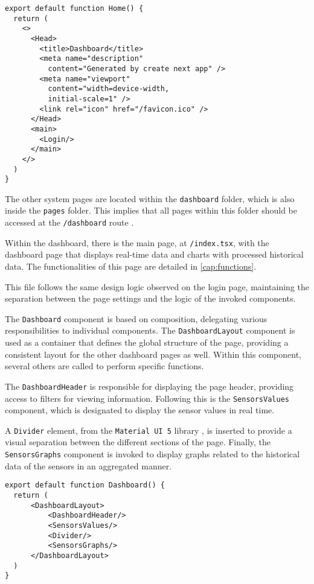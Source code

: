 \begin{Verbatim}[fontsize=\small, baselinestretch=0.8]
export default function Home() {
  return (
    <>
      <Head>
        <title>Dashboard</title>
        <meta name="description" 
          content="Generated by create next app" />
        <meta name="viewport" 
          content="width=device-width,
          initial-scale=1" />
        <link rel="icon" href="/favicon.ico" />
      </Head>
      <main>
        <Login/>
      </main>
    </>
  )
}
\end{Verbatim}

The other system pages are located within the \texttt{dashboard} folder, which is also inside the \texttt{pages} folder. This implies that all pages within this folder should be accessed at the \texttt{/dashboard} route \cite{nextjsDefiningRoutes}.

Within the dashboard, there is the main page, at \texttt{/index.tsx}, with the dashboard page that displays real-time data and charts with processed historical data. The functionalities of this page are detailed in \ref{cap:functions}.

This file follows the same design logic observed on the login page, maintaining the separation between the page settings and the logic of the invoked components.

The \texttt{Dashboard} component is based on composition, delegating various responsibilities to individual components. The \texttt{DashboardLayout} component is used as a container that defines the global structure of the page, providing a consistent layout for the other dashboard pages as well. Within this component, several others are called to perform specific functions.

The \texttt{DashboardHeader} is responsible for displaying the page header, providing access to filters for viewing information. Following this is the \texttt{SensorsValues} component, which is designated to display the sensor values in real time.

A \texttt{Divider} element, from the \texttt{Material UI 5} library \cite{muiDocs}, is inserted to provide a visual separation between the different sections of the page. Finally, the \texttt{SensorsGraphs} component is invoked to display graphs related to the historical data of the sensors in an aggregated manner.

\begin{Verbatim}[fontsize=\small, baselinestretch=0.8]
export default function Dashboard() {
  return (
      <DashboardLayout>
          <DashboardHeader/>
          <SensorsValues/>
          <Divider/>
          <SensorsGraphs/>
      </DashboardLayout>
  )
}
\end{Verbatim}


